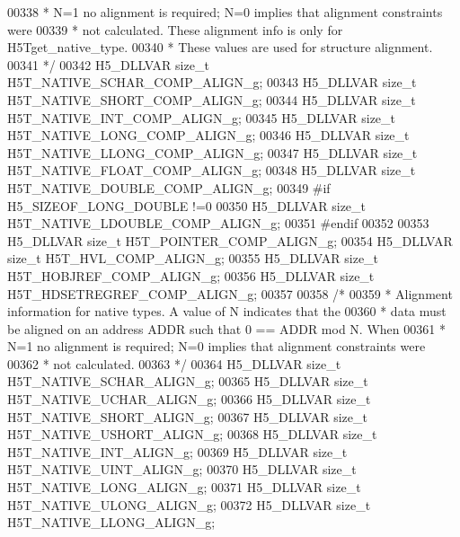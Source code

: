 \begin{DoxyCode}
00338 \textcolor{comment}{ * N=1 no alignment is required; N=0 implies that alignment constraints were}
00339 \textcolor{comment}{ * not calculated.  These alignment info is only for H5Tget\_native\_type.}
00340 \textcolor{comment}{ * These values are used for structure alignment.}
00341 \textcolor{comment}{ */}
00342 H5\_DLLVAR \textcolor{keywordtype}{size\_t}    H5T\_NATIVE\_SCHAR\_COMP\_ALIGN\_g;
00343 H5\_DLLVAR \textcolor{keywordtype}{size\_t}    H5T\_NATIVE\_SHORT\_COMP\_ALIGN\_g;
00344 H5\_DLLVAR \textcolor{keywordtype}{size\_t}    H5T\_NATIVE\_INT\_COMP\_ALIGN\_g;
00345 H5\_DLLVAR \textcolor{keywordtype}{size\_t}    H5T\_NATIVE\_LONG\_COMP\_ALIGN\_g;
00346 H5\_DLLVAR \textcolor{keywordtype}{size\_t}    H5T\_NATIVE\_LLONG\_COMP\_ALIGN\_g;
00347 H5\_DLLVAR \textcolor{keywordtype}{size\_t}    H5T\_NATIVE\_FLOAT\_COMP\_ALIGN\_g;
00348 H5\_DLLVAR \textcolor{keywordtype}{size\_t}    H5T\_NATIVE\_DOUBLE\_COMP\_ALIGN\_g;
00349 \textcolor{preprocessor}{#if H5\_SIZEOF\_LONG\_DOUBLE !=0}
00350 H5\_DLLVAR \textcolor{keywordtype}{size\_t}    H5T\_NATIVE\_LDOUBLE\_COMP\_ALIGN\_g;
00351 \textcolor{preprocessor}{#endif}
00352 
00353 H5\_DLLVAR \textcolor{keywordtype}{size\_t} H5T\_POINTER\_COMP\_ALIGN\_g;
00354 H5\_DLLVAR \textcolor{keywordtype}{size\_t} H5T\_HVL\_COMP\_ALIGN\_g;
00355 H5\_DLLVAR \textcolor{keywordtype}{size\_t} H5T\_HOBJREF\_COMP\_ALIGN\_g;
00356 H5\_DLLVAR \textcolor{keywordtype}{size\_t} H5T\_HDSETREGREF\_COMP\_ALIGN\_g;
00357 
00358 \textcolor{comment}{/*}
00359 \textcolor{comment}{ * Alignment information for native types. A value of N indicates that the}
00360 \textcolor{comment}{ * data must be aligned on an address ADDR such that 0 == ADDR mod N. When}
00361 \textcolor{comment}{ * N=1 no alignment is required; N=0 implies that alignment constraints were}
00362 \textcolor{comment}{ * not calculated.}
00363 \textcolor{comment}{ */}
00364 H5\_DLLVAR \textcolor{keywordtype}{size\_t}    H5T\_NATIVE\_SCHAR\_ALIGN\_g;
00365 H5\_DLLVAR \textcolor{keywordtype}{size\_t}    H5T\_NATIVE\_UCHAR\_ALIGN\_g;
00366 H5\_DLLVAR \textcolor{keywordtype}{size\_t}    H5T\_NATIVE\_SHORT\_ALIGN\_g;
00367 H5\_DLLVAR \textcolor{keywordtype}{size\_t}    H5T\_NATIVE\_USHORT\_ALIGN\_g;
00368 H5\_DLLVAR \textcolor{keywordtype}{size\_t}    H5T\_NATIVE\_INT\_ALIGN\_g;
00369 H5\_DLLVAR \textcolor{keywordtype}{size\_t}    H5T\_NATIVE\_UINT\_ALIGN\_g;
00370 H5\_DLLVAR \textcolor{keywordtype}{size\_t}    H5T\_NATIVE\_LONG\_ALIGN\_g;
00371 H5\_DLLVAR \textcolor{keywordtype}{size\_t}    H5T\_NATIVE\_ULONG\_ALIGN\_g;
00372 H5\_DLLVAR \textcolor{keywordtype}{size\_t}    H5T\_NATIVE\_LLONG\_ALIGN\_g;

\end{DoxyCode}
